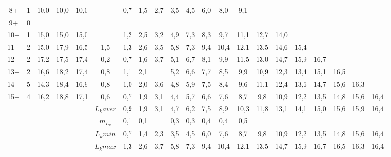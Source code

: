 \begin{landscape}
\begin{table}[h]
\begin{tabular}{|c|c|cc|cc|ccccccccccccccc|}
8+      & 1 & 10,0  & 10,0  & 10,0    &         & 0,7 & 1,5 & 2,7 & 3,5 & 4,5 & 6,0 & 8,0  & 9,1  &      &      &      &      &      &      &      \\
9+      & 0 &       &       &         &         &     &     &     &     &     &     &      &      &      &      &      &      &      &      &      \\
10+     & 1 & 15,0  & 15,0  & 15,0    &         & 1,2 & 2,5 & 3,2 & 4,9 & 7,3 & 8,3 & 9,7  & 11,1 & 12,7 & 14,0 &      &      &      &      &      \\
11+     & 2 & 15,0  & 17,9  & 16,5    & 1,5     & 1,3 & 2,6 & 3,5 & 5,8 & 7,3 & 9,4 & 10,4 & 12,1 & 13,5 & 14,6 & 15,4 &      &      &      &      \\
12+     & 2 & 17,2  & 17,5  & 17,4    & 0,2     & 0,7 & 1,6 & 3,7 & 5,1 & 6,7 & 8,1 & 9,9  & 11,5 & 13,0 & 14,7 & 15,9 & 16,7 &      &      &      \\
13+     & 2 & 16,6  & 18,2  & 17,4    & 0,8     & 1,1 & 2,1 &     & 5,2 & 6,6 & 7,7 & 8,5  & 9,9  & 10,9 & 12,3 & 13,4 & 15,1 & 16,5 &      &      \\
14+     & 5 & 14,3  & 18,4  & 16,9    & 0,8     & 1,0 & 2,0 & 3,6 & 4,8 & 5,9 & 7,5 & 8,4  & 9,6  & 11,1 & 12,4 & 13,6 & 14,7 & 15,6 & 16,3 &      \\
15+     & 4 & 16,2  & 18,8  & 17,1    & 0,6     & 0,7 & 1,9 & 3,1 & 4,4 & 5,7 & 6,6 & 7,6  & 8,7  & 9,8  & 10,9 & 12,2 & 13,5 & 14,8 & 15,6 & 16,4 \\\hline
        &   &       &       &         & $L_k aver$ & 0,9 & 1,9 & 3,1 & 4,7 & 6,2 & 7,5 & 8,9  & 10,3 & 11,8 & 13,1 & 14,1 & 15,0 & 15,6 & 15,9 & 16,4 \\
        &   &       &       &         & $m_{L_k}$  & 0,1 & 0,1 &     & 0,3 & 0,3 & 0,4 & 0,4  & 0,5  &      &      &      &      &      &      &      \\
        &   &       &       &         & $L_k min$  & 0,7 & 1,4 & 2,3 & 3,5 & 4,5 & 6,0 & 7,6  & 8,7  & 9,8  & 10,9 & 12,2 & 13,5 & 14,8 & 15,6 & 16,4 \\
        &   &       &       &         & $L_k max$  & 1,3 & 2,6 & 3,7 & 5,8 & 7,3 & 9,4 & 10,4 & 12,1 & 13,5 & 14,7 & 15,9 & 16,7 & 16,5 & 16,3 & 16,4 \\ \hline
\end{tabular}
\end{table}


\end{landscape}
